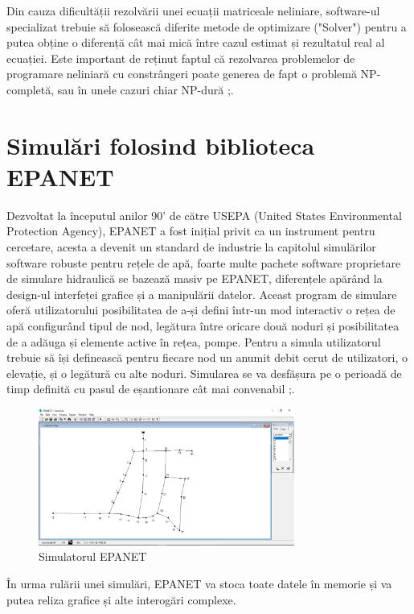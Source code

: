 Din cauza dificultății rezolvării unei ecuații matriceale neliniare, software-ul specializat trebuie să folosească diferite metode de optimizare ("Solver") pentru a putea obține o diferență cât mai mică între cazul estimat și rezultatul real al ecuației. Este important de reținut faptul că rezolvarea problemelor de programare neliniară cu constrângeri poate generea de fapt o problemă NP-completă, sau în unele cazuri chiar NP-dură ;\cite{karp1975computational}.

\section{Simulări folosind biblioteca EPANET}

Dezvoltat la începutul anilor 90' de către USEPA (United States Environmental Protection Agency), EPANET a fost inițial privit ca un instrument pentru cercetare, acesta a devenit un standard de industrie la capitolul simulărilor software robuste pentru rețele de apă, foarte multe pachete software proprietare de simulare hidraulică se bazează masiv pe EPANET, diferențele apărând la design-ul interfeței grafice și a manipulării datelor. Aceast program de simulare oferă utilizatorului posibilitatea de a-și defini într-un mod interactiv o rețea de apă configurând tipul de nod, legătura între oricare două noduri și posibilitatea de a adăuga și elemente active în rețea, pompe. Pentru a simula utilizatorul trebuie să își definească pentru fiecare nod un anumit debit cerut de utilizatori, o elevație, și o legătură cu alte noduri. Simularea se va desfășura pe o perioadă de timp definită cu pasul de eșantionare cât mai convenabil ;\cite{rossman2000epanet}.
	
\begin{figure}[H]
\centering
\includegraphics[width=0.75\textwidth]{pics/c2_pics/epanet_simulator.png}
\caption{Simulatorul EPANET}
\label{fig:epanet_simulator_win}
\end{figure}

În urma rulării unei simulări, EPANET va stoca toate datele în memorie și va putea reliza grafice și alte interogări complexe.

